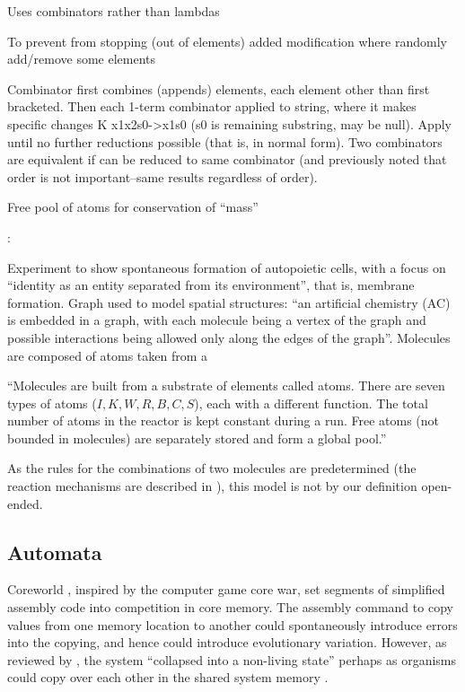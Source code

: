 \begin{NOTES}
Uses combinators rather than lambdas

To prevent from stopping (out of elements) added modification where randomly add/remove some elements

Combinator first combines (appends) elements, each element other than first bracketed. Then each 1-term combinator applied to string, where it makes specific changes \eg K x1x2s0-\textgreater{}x1s0 (s0 is remaining substring, may be null). Apply until no further reductions possible (that is, in normal form). Two combinators are equivalent if can be reduced to same combinator (and previously noted that order is not important--same results regardless of order).

Free pool of atoms for conservation of ``mass''

\parencite{Fenizio2001}:

Experiment to show spontaneous formation of autopoietic cells, with a focus on ``identity as an entity separated from its environment'', that is, membrane formation. Graph used to model spatial structures: ``an artificial chemistry (AC) is embedded in a graph, with each molecule being a vertex of the graph and possible interactions being allowed only along the edges of the graph''. Molecules are composed of atoms taken from a 

``Molecules are built from a substrate of elements called atoms. There are seven types of atoms ($I, K, W, R, B, C, S$), each with a different function. The total number of atoms in the reactor is kept constant during a run. Free atoms (not bounded in molecules) are separately stored and form a global pool.''

As the rules for the combinations of two molecules are predetermined (the reaction mechanisms are described in \cite{Fenizio2000}), this model is not by our definition open-ended.

\subsection{Automata}

Coreworld \parencite{Rasmussen1990}, inspired by the computer game core war, set segments of simplified assembly code into competition in core memory. The assembly command to copy values from one memory location to another could spontaneously introduce errors into the copying, and hence could introduce evolutionary variation. However, as reviewed by \cite{Ofria2004}, the system ``collapsed into a non-living state'' perhaps as organisms could copy over each other in the shared system memory \parencite{Ofria2004}.


\end{NOTES}
